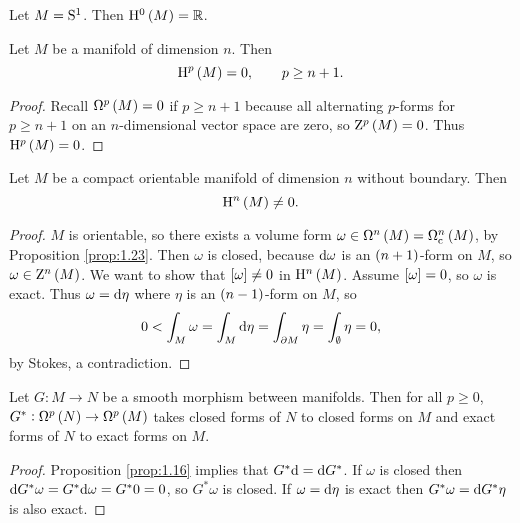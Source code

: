 \begin{example*}
Let $ M = \S^1 $. Then $ \H^0\br{M} = \RR $.
\end{example*}

\begin{proposition}
Let $ M $ be a manifold of dimension $ n $. Then
$$ \H^p\br{M} = 0, \qquad p \ge n + 1. $$
\end{proposition}

\begin{proof}
Recall $ \Omega^p\br{M} = 0 $ if $ p \ge n + 1 $ because all alternating $ p $-forms for $ p \ge n + 1 $ on an $ n $-dimensional vector space are zero, so $ \Z^p\br{M} = 0 $. Thus $ \H^p\br{M} = 0 $.
\end{proof}

\begin{proposition}
Let $ M $ be a compact orientable manifold of dimension $ n $ without boundary. Then
$$ \H^n\br{M} \ne 0. $$
\end{proposition}

\begin{proof}
$ M $ is orientable, so there exists a volume form $ \omega \in \Omega^n\br{M} = \Omega_\c^n\br{M} $, by Proposition \ref{prop:1.23}. Then $ \omega $ is closed, because $ \d\omega $ is an $ \br{n + 1} $-form on $ M $, so $ \omega \in \Z^n\br{M} $. We want to show that $ \sbr{\omega} \ne 0 $ in $ \H^n\br{M} $. Assume $ \sbr{\omega} = 0 $, so $ \omega $ is exact. Thus $ \omega = \d\eta $ where $ \eta $ is an $ \br{n - 1} $-form on $ M $, so
$$ 0 < \int_M \omega = \int_M \d\eta = \int_{\partial M} \eta = \int_\emptyset \eta = 0, $$
by Stokes, a contradiction.
\end{proof}

\pagebreak

\begin{proposition}
\label{prop:2.7}
Let $ G : M \to N $ be a smooth morphism between manifolds. Then for all $ p \ge 0 $, $ G^* : \Omega^p\br{N} \to \Omega^p\br{M} $ takes closed forms of $ N $ to closed forms on $ M $ and exact forms of $ N $ to exact forms on $ M $.
\end{proposition}

\begin{proof}
Proposition \ref{prop:1.16} implies that $ G^*\d = \d G^* $. If $ \omega $ is closed then $ \d G^*\omega = G^*\d\omega = G^*0 = 0 $, so $ G^*\omega $ is closed. If $ \omega = \d\eta $ is exact then $ G^*\omega = \d G^*\eta $ is also exact.
\end{proof}

